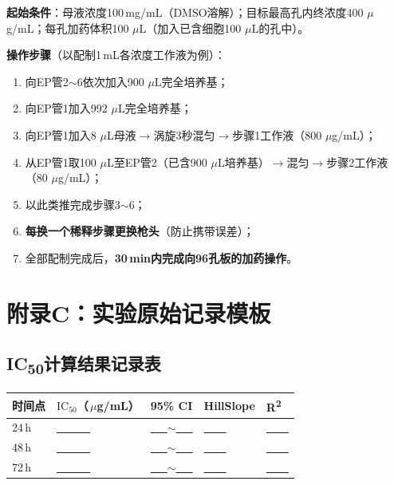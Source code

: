 \documentclass[12pt,a4paper]{article}
\newcommand{\ic}{\ensuremath{\text{IC}_{50}}}
\newcommand{\um}{\,$\mu$g/mL}
\newcommand{\uul}{\,$\mu$L}
\begin{document}
\textbf{起始条件}：母液浓度100\,mg/mL（DMSO溶解）；目标最高孔内终浓度400\,\um{}；每孔加药体积100\,\uul{}（加入已含细胞100\,\uul{}的孔中）。

\textbf{操作步骤}（以配制1\,mL各浓度工作液为例）：
\begin{enumerate}
\item 向EP管2$\sim$6依次加入900\,\uul{}完全培养基；
\item 向EP管1加入992\,\uul{}完全培养基；
\item 向EP管1加入8\,\uul{}母液$\to$涡旋3秒混匀$\to$步骤1工作液（800\,\um{}）；
\item 从EP管1取100\,\uul{}至EP管2（已含900\,\uul{}培养基）$\to$混匀$\to$步骤2工作液（80\,\um{}）；
\item 以此类推完成步骤3$\sim$6；
\item \textbf{每换一个稀释步骤更换枪头}（防止携带误差）；
\item 全部配制完成后，\textbf{30\,min内完成向96孔板的加药操作}。
\end{enumerate}

\section{附录C：实验原始记录模板}

\subsection{IC\textsubscript{50}计算结果记录表}

\begin{center}
\begin{tabular}{lllll}
\toprule
\textbf{时间点} & \textbf{\ic{}（\um{}）} & \textbf{95\% CI} & \textbf{HillSlope} & \textbf{R\textsuperscript{2}} \\
\midrule
24\,h & \underline{\ \ \ \ \ \ } & \underline{\ \ \ }$\sim$\underline{\ \ \ } & \underline{\ \ \ \ } & \underline{\ \ \ \ } \\
48\,h & \underline{\ \ \ \ \ \ } & \underline{\ \ \ }$\sim$\underline{\ \ \ } & \underline{\ \ \ \ } & \underline{\ \ \ \ } \\
72\,h & \underline{\ \ \ \ \ \ } & \underline{\ \ \ }$\sim$\underline{\ \ \ } & \underline{\ \ \ \ } & \underline{\ \ \ \ } \\
\bottomrule
\end{tabular}
\end{center}
\end{document}
